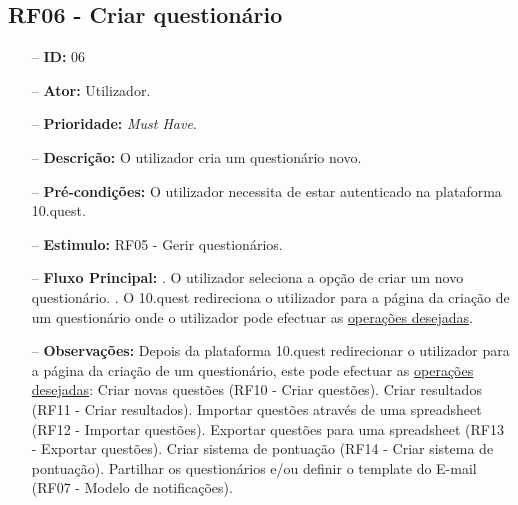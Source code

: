 \subsection{RF06 - Criar questionário}
\begin{itemize}
	\item[--] \textbf{ID:} 06
	\item[--]  \textbf{Ator:} Utilizador.
	\item[--]  \textbf{Prioridade:} \textit{Must Have}.
	\item[--]  \textbf{Descrição:} O utilizador cria um questionário novo.
	\item[--]  \textbf{Pré-condições:} O utilizador necessita de estar autenticado na plataforma 10.quest.
	\item[--]  \textbf{Estimulo:} RF05 - Gerir questionários.
	\item[--]  \textbf{Fluxo Principal:} 
		. O utilizador seleciona a opção de criar um novo questionário.
		. O 10.quest redireciona o utilizador para a página da criação de um questionário onde o utilizador pode efectuar as \underline{operações desejadas}.
	\item[--]  \textbf{Observações:} Depois da plataforma 10.quest redirecionar o utilizador para a página da criação de um questionário, este pode efectuar as \underline{operações desejadas}:
		\subitem Criar novas questões (RF10 - Criar questões).
		\subitem Criar resultados (RF11 - Criar resultados).
		\subitem Importar questões através de uma spreadsheet (RF12 - Importar questões).
		\subitem Exportar questões para uma spreadsheet (RF13 - Exportar questões).
		\subitem Criar sistema de pontuação (RF14 - Criar sistema de pontuação).
		\subitem Partilhar os questionários e/ou definir o template do E-mail (RF07 - Modelo de notificações).
\end{itemize}
\newpage

